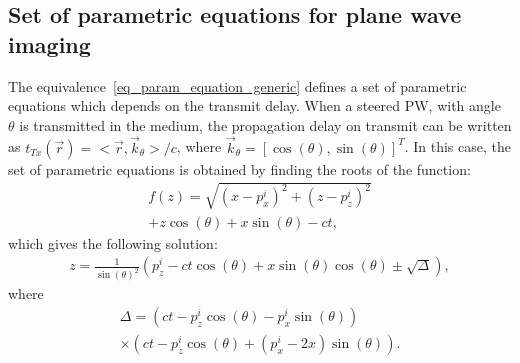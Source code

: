 \documentclass[conference]{IEEEtran}
\begin{document}
\subsection{Set of parametric equations for plane wave imaging}
\label{subsec_meas_model_param_equation}
The equivalence~\eqref{eq_param_equation_generic} defines a set of parametric equations which depends on the transmit delay. 
When a steered PW, with angle $\theta$ is transmitted in the medium, the propagation delay on transmit can be written as $t_{Tx} \left(\vec{r}\right) = <\vec{r}, \vec{k}_\theta> /c$, where $\vec{k}_\theta = \left[\cos \left(\theta\right), \sin \left(\theta\right)\right]^T$. In this case, the set of parametric equations is obtained by finding the roots of the function:
\begin{multline}
	f \left(z\right) = \sqrt{\left(x-p^i_x\right)^2 + \left(z-p^i_z\right)^2} \\ + z \cos\left(\theta\right)  + x \sin\left(\theta\right) - ct,
\end{multline}
which gives the following solution:
\begin{align}
	z = \frac{1}{\sin \left(\theta\right)^2} \left(p^i_z - ct \cos \left(\theta\right) + x \sin \left(\theta\right) \cos \left(\theta\right) \pm \sqrt{\Delta} \right),
\end{align}
where
\begin{multline}
\Delta = \left(ct-p^i_z \cos \left(\theta\right) - p^i_x \sin \left(\theta\right) \right) \\ \times \left(ct-p^i_z \cos \left(\theta\right) + \left(p^i_x -2 x\right) \sin \left(\theta\right) \right).
\end{multline}

\end{document}
